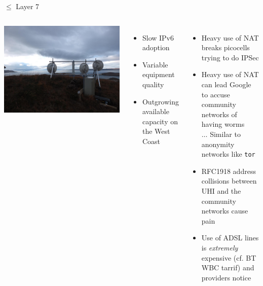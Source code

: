 \documentclass{beamer}
\begin{document}
\begin{frame}{$\leq$ Layer 7}
  \begin{columns}
    \includegraphics[width=\textwidth]{creagan-dearga-mast.jpg}\\
    \begin{itemize}
      \item Slow IPv6 adoption
      \item Variable equipment quality
      \item Outgrowing available capacity on the West
        Coast
    \end{itemize}
    \begin{itemize}
      \item Heavy use of NAT breaks picocells trying to do IPSec
      \item Heavy use of NAT can lead Google to accuse community
        networks of having worms\\
        $\ldots$ Similar to anonymity networks like \texttt{tor}
      \item RFC1918 address collisions between UHI and the community
        networks cause pain
      \item Use of ADSL lines is \textit{extremely} expensive (cf.
        BT WBC tarrif) and providers notice
    \end{itemize}
  \end{columns}
\end{frame}
\end{document}
